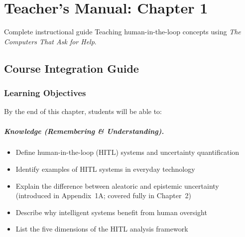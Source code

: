 
\chapter{Teacher's Manual: Chapter 1}
\label{ch:teacher-ch01}

\begin{chapterquote}{Complete instructional guide}
Teaching human-in-the-loop concepts using \emph{The Computers That Ask for Help}.
\end{chapterquote}

\section{Course Integration Guide}

\subsection{Learning Objectives}

By the end of this chapter, students will be able to:

\paragraph{Knowledge (Remembering \& Understanding).}
\begin{itemize}
    \item Define human-in-the-loop (HITL) systems and uncertainty quantification
    \item Identify examples of HITL systems in everyday technology
    \item Explain the difference between aleatoric and epistemic uncertainty (introduced in Appendix~1A; covered fully in Chapter~2)
    \item Describe why intelligent systems benefit from human oversight
    \item List the five dimensions of the HITL analysis framework
\end{itemize}

